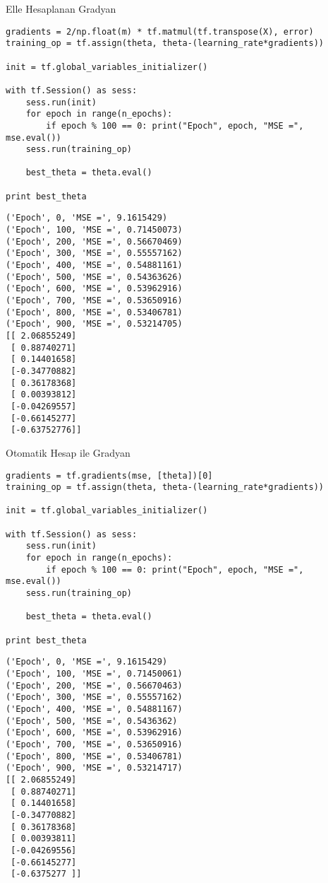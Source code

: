 \documentclass[12pt,fleqn]{article}\usepackage{../../common}
\begin{document}
Elle Hesaplanan Gradyan

\begin{verbatim}
gradients = 2/np.float(m) * tf.matmul(tf.transpose(X), error)
training_op = tf.assign(theta, theta-(learning_rate*gradients))

init = tf.global_variables_initializer()

with tf.Session() as sess:
    sess.run(init)
    for epoch in range(n_epochs):
        if epoch % 100 == 0: print("Epoch", epoch, "MSE =", mse.eval())
	sess.run(training_op)
    
    best_theta = theta.eval()
    
print best_theta
\end{verbatim}


\begin{verbatim}
('Epoch', 0, 'MSE =', 9.1615429)
('Epoch', 100, 'MSE =', 0.71450073)
('Epoch', 200, 'MSE =', 0.56670469)
('Epoch', 300, 'MSE =', 0.55557162)
('Epoch', 400, 'MSE =', 0.54881161)
('Epoch', 500, 'MSE =', 0.54363626)
('Epoch', 600, 'MSE =', 0.53962916)
('Epoch', 700, 'MSE =', 0.53650916)
('Epoch', 800, 'MSE =', 0.53406781)
('Epoch', 900, 'MSE =', 0.53214705)
[[ 2.06855249]
 [ 0.88740271]
 [ 0.14401658]
 [-0.34770882]
 [ 0.36178368]
 [ 0.00393812]
 [-0.04269557]
 [-0.66145277]
 [-0.63752776]]
\end{verbatim}

Otomatik Hesap ile Gradyan

\begin{verbatim}
gradients = tf.gradients(mse, [theta])[0]
training_op = tf.assign(theta, theta-(learning_rate*gradients))

init = tf.global_variables_initializer()

with tf.Session() as sess:
    sess.run(init)
    for epoch in range(n_epochs):
        if epoch % 100 == 0: print("Epoch", epoch, "MSE =", mse.eval())
	sess.run(training_op)
    
    best_theta = theta.eval()
    
print best_theta
\end{verbatim}

\begin{verbatim}
('Epoch', 0, 'MSE =', 9.1615429)
('Epoch', 100, 'MSE =', 0.71450061)
('Epoch', 200, 'MSE =', 0.56670463)
('Epoch', 300, 'MSE =', 0.55557162)
('Epoch', 400, 'MSE =', 0.54881167)
('Epoch', 500, 'MSE =', 0.5436362)
('Epoch', 600, 'MSE =', 0.53962916)
('Epoch', 700, 'MSE =', 0.53650916)
('Epoch', 800, 'MSE =', 0.53406781)
('Epoch', 900, 'MSE =', 0.53214717)
[[ 2.06855249]
 [ 0.88740271]
 [ 0.14401658]
 [-0.34770882]
 [ 0.36178368]
 [ 0.00393811]
 [-0.04269556]
 [-0.66145277]
 [-0.6375277 ]]
\end{verbatim}
\end{document}
